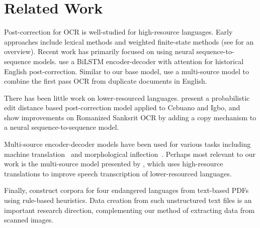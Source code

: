 \section{Related Work}
Post-correction for OCR is well-studied for high-resource languages. Early approaches include lexical methods and weighted finite-state methods (see \citet{schulz-kuhn-2017-multi} for an overview). Recent work has primarily focused on using neural sequence-to-sequence models. \citet{hamalainen-hengchen-2019-paft} use a BiLSTM encoder-decoder with attention for historical English post-correction. Similar to our base model, \citet{dong-smith-2018-multi} use a multi-source model to combine the first pass OCR from duplicate documents in English. 

There has been little work on lower-resourced languages. \citet{kolak-resnik-2005-ocr} present a probabilistic edit distance based post-correction model applied to Cebuano and Igbo, and \citet{krishna-etal-2018-upcycle} show improvements on Romanized Sanksrit OCR by adding a copy mechanism to a neural sequence-to-sequence model.

Multi-source encoder-decoder models have been used for various tasks including machine translation~\cite{zoph-knight-2016-multi,libovicky-helcl-2017-attention} and morphological inflection~\cite{kann-etal-2017-neural,anastasopoulos-neubig-2019-pushing}. Perhaps most relevant to our work is the multi-source model presented by \citet{anastasopoulos+chiang:interspeech2018}, which uses high-resource translations to improve speech transcription of lower-resourced languages.

Finally, \citet{bustamante-etal-2020-data} construct corpora for four endangered languages from text-based PDFs using rule-based heuristics. Data creation from such unstructured text files is an important research direction, complementing our method of extracting data from scanned images.